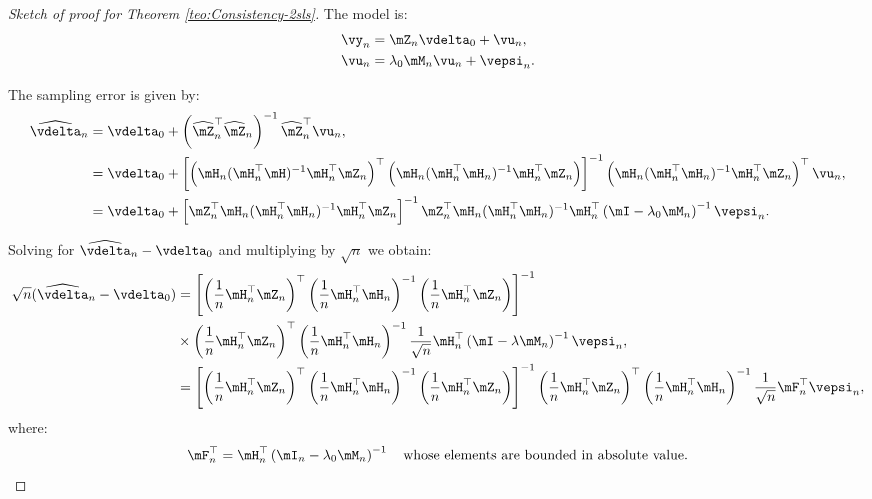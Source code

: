 \begin{proof}[Sketch of proof for Theorem \ref{teo:Consistency-2sls}]
The model is:
\begin{equation*}
\begin{aligned}
	\vy_n & = \mZ_n\vdelta_0 + \vu_n,\\
	\vu_n & = \lambda_0 \mM_n \vu_n + \vepsi_n.
\end{aligned}
\end{equation*}


The sampling error is given by:
\begin{equation*}
  \begin{aligned}
     \widehat{\vdelta}_n & =  \vdelta_0 + \left(\widehat{\mZ}^\top_n\widehat{\mZ}_n\right)^{-1}\widehat{\mZ}^\top_n\vu_n, \\
     & = \vdelta_0 + \left[\left(\mH_n(\mH_n^\top\mH)^{-1}\mH_n^\top\mZ_n\right)^\top\left(\mH_n(\mH^\top_n\mH_n)^{-1}\mH^\top_n\mZ_n\right)\right]^{-1}\left(\mH_n(\mH_n^\top\mH_n)^{-1}\mH_n^\top\mZ_n\right)^\top\vu_n,\\
     & = \vdelta_0 + \left[\mZ^\top_n \mH_n (\mH^\top_n\mH_n)^{-1}\mH^\top_n\mZ_n\right]^{-1}\mZ^\top_n\mH_n(\mH^\top_n\mH_n)^{-1}\mH^\top_n\left(\mI -\lambda_0\mM_n\right)^{-1}\vepsi_n.
  \end{aligned}
\end{equation*}

Solving for $\widehat{\vdelta}_{n} - \vdelta_0$ and multiplying by $\sqrt{n}$ we obtain:
\begin{equation*}
\begin{aligned}
\sqrt{n}(\widehat{\vdelta}_{n} - \vdelta_0) & = \left[\left(\frac{1}{n}\mH^\top_n\mZ_n \right)^\top\left(\frac{1}{n}\mH^\top_n\mH_n\right)^{-1}\left(\frac{1}{n}\mH^\top_n\mZ_n \right)\right]^{-1} \\
& \times \left(\frac{1}{n}\mH^\top_n\mZ_n \right)^\top\left(\frac{1}{n}\mH^\top_n\mH_n\right)^{-1}\frac{1}{\sqrt{n}}\mH^\top_n\left(\mI -\lambda\mM_n\right)^{-1}\vepsi_n, \\
             & = \left[\left(\frac{1}{n}\mH^\top_n\mZ_n \right)^\top\left(\frac{1}{n}\mH^\top_n\mH_n\right)^{-1}\left(\frac{1}{n}\mH^\top_n\mZ_n \right)\right]^{-1}\left(\frac{1}{n}\mH^\top_n\mZ_n \right)^\top\left(\frac{1}{n}\mH^\top_n\mH_n\right)^{-1}\frac{1}{\sqrt{n}}\mF_n^\top\vepsi_n,
\end{aligned}
\end{equation*}
%
where:
\begin{equation*}
\mF_n^\top = \mH^\top_n\left(\mI_n -\lambda_0\mM_n\right)^{-1} \quad \mbox{whose elements are bounded in absolute value.}
\end{equation*}


\end{proof}
